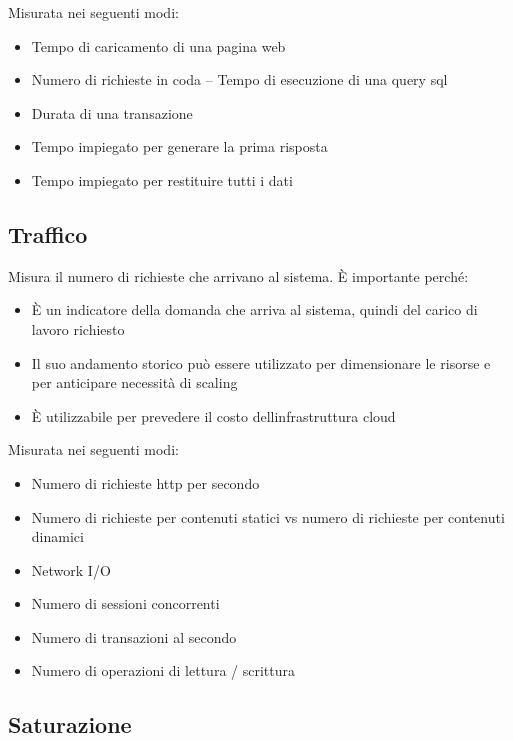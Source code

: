 Misurata nei seguenti modi:

\begin{itemize}
\item
  Tempo di caricamento di una pagina web
\item
  Numero di richieste in coda -- Tempo di esecuzione di una query sql
\item
  Durata di una transazione
\item
  Tempo impiegato per generare la prima risposta
\item
  Tempo impiegato per restituire tutti i dati
\end{itemize}

\subsection{Traffico}\label{traffico}

Misura il numero di richieste che arrivano al sistema. È importante
perché:

\begin{itemize}
\item
  È un indicatore della domanda che arriva al sistema, quindi del carico
  di lavoro richiesto
\item
  Il suo andamento storico può essere utilizzato per dimensionare le
  risorse e per anticipare necessità di scaling
\item
  È utilizzabile per prevedere il costo
  dell\textquotesingle infrastruttura cloud
\end{itemize}

Misurata nei seguenti modi:

\begin{itemize}
\item
  Numero di richieste http per secondo
\item
  Numero di richieste per contenuti statici vs numero di richieste per
  contenuti dinamici
\item
  Network I/O
\item
  Numero di sessioni concorrenti
\item
  Numero di transazioni al secondo
\item
  Numero di operazioni di lettura / scrittura
\end{itemize}

\subsection{Saturazione}\label{saturazione}

